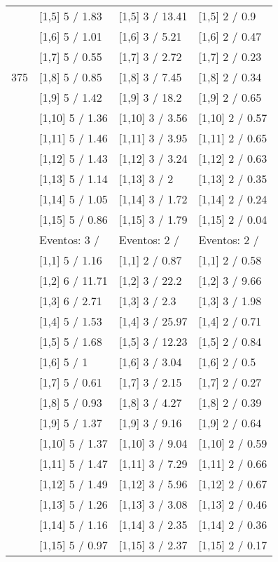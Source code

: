 \begin{table}
\begin{tabular}[t]{llll}
 & {}[1,5] 5  / 1.83 & {}[1,5] 3  / 13.41 & {}[1,5] 2  / 0.9\\
 & {}[1,6] 5  / 1.01 & {}[1,6] 3  / 5.21 & {}[1,6] 2  / 0.47\\
 & {}[1,7] 5  / 0.55 & {}[1,7] 3  / 2.72 & {}[1,7] 2  / 0.23\\
375 & {}[1,8] 5  / 0.85 & {}[1,8] 3  / 7.45 & {}[1,8] 2  / 0.34\\
\addlinespace
 & {}[1,9] 5  / 1.42 & {}[1,9] 3  / 18.2 & {}[1,9] 2  / 0.65\\
 & {}[1,10] 5  / 1.36 & {}[1,10] 3  / 3.56 & {}[1,10] 2  / 0.57\\
 & {}[1,11] 5  / 1.46 & {}[1,11] 3  / 3.95 & {}[1,11] 2  / 0.65\\
 & {}[1,12] 5  / 1.43 & {}[1,12] 3  / 3.24 & {}[1,12] 2  / 0.63\\
 & {}[1,13] 5  / 1.14 & {}[1,13] 3  / 2 & {}[1,13] 2  / 0.35\\
\addlinespace
 & {}[1,14] 5  / 1.05 & {}[1,14] 3  / 1.72 & {}[1,14] 2  / 0.24\\
 & {}[1,15] 5  / 0.86 & {}[1,15] 3  / 1.79 & {}[1,15] 2  / 0.04\\
 & Eventos:  3 / & Eventos:  2 / & Eventos:  2 /\\
 & {}[1,1] 5  / 1.16 & {}[1,1] 2  / 0.87 & {}[1,1] 2  / 0.58\\
 & {}[1,2] 6  / 11.71 & {}[1,2] 3  / 22.2 & {}[1,2] 3  / 9.66\\
\addlinespace
 & {}[1,3] 6  / 2.71 & {}[1,3] 3  / 2.3 & {}[1,3] 3  / 1.98\\
 & {}[1,4] 5  / 1.53 & {}[1,4] 3  / 25.97 & {}[1,4] 2  / 0.71\\
 & {}[1,5] 5  / 1.68 & {}[1,5] 3  / 12.23 & {}[1,5] 2  / 0.84\\
 & {}[1,6] 5  / 1 & {}[1,6] 3  / 3.04 & {}[1,6] 2  / 0.5\\
 & {}[1,7] 5  / 0.61 & {}[1,7] 3  / 2.15 & {}[1,7] 2  / 0.27\\
\addlinespace
500 & {}[1,8] 5  / 0.93 & {}[1,8] 3  / 4.27 & {}[1,8] 2  / 0.39\\
 & {}[1,9] 5  / 1.37 & {}[1,9] 3  / 9.16 & {}[1,9] 2  / 0.64\\
 & {}[1,10] 5  / 1.37 & {}[1,10] 3  / 9.04 & {}[1,10] 2  / 0.59\\
 & {}[1,11] 5  / 1.47 & {}[1,11] 3  / 7.29 & {}[1,11] 2  / 0.66\\
 & {}[1,12] 5  / 1.49 & {}[1,12] 3  / 5.96 & {}[1,12] 2  / 0.67\\
\addlinespace
 & {}[1,13] 5  / 1.26 & {}[1,13] 3  / 3.08 & {}[1,13] 2  / 0.46\\
 & {}[1,14] 5  / 1.16 & {}[1,14] 3  / 2.35 & {}[1,14] 2  / 0.36\\
 & {}[1,15] 5  / 0.97 & {}[1,15] 3  / 2.37 & {}[1,15] 2  / 0.17\\
\bottomrule
\end{tabular}
\end{table}
